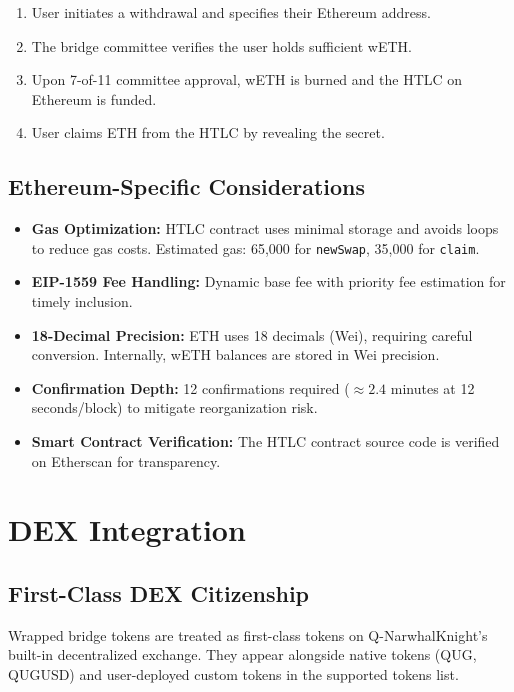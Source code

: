 \documentclass[11pt,a4paper]{article}
\begin{document}
\begin{enumerate}
    \item User initiates a withdrawal and specifies their Ethereum address.
    \item The bridge committee verifies the user holds sufficient wETH.
    \item Upon 7-of-11 committee approval, wETH is burned and the HTLC on Ethereum is funded.
    \item User claims ETH from the HTLC by revealing the secret.
\end{enumerate}

\subsection{Ethereum-Specific Considerations}

\begin{itemize}
    \item \textbf{Gas Optimization:} HTLC contract uses minimal storage and avoids loops to reduce gas costs. Estimated gas: 65,000 for \texttt{newSwap}, 35,000 for \texttt{claim}.
    \item \textbf{EIP-1559 Fee Handling:} Dynamic base fee with priority fee estimation for timely inclusion.
    \item \textbf{18-Decimal Precision:} ETH uses 18 decimals (Wei), requiring careful conversion. Internally, wETH balances are stored in Wei precision.
    \item \textbf{Confirmation Depth:} 12 confirmations required ($\approx 2.4$ minutes at 12 seconds/block) to mitigate reorganization risk.
    \item \textbf{Smart Contract Verification:} The HTLC contract source code is verified on Etherscan for transparency.
\end{itemize}

\section{DEX Integration}
\label{sec:dex}

\subsection{First-Class DEX Citizenship}

Wrapped bridge tokens are treated as first-class tokens on Q-NarwhalKnight's built-in decentralized exchange. They appear alongside native tokens (QUG, QUGUSD) and user-deployed custom tokens in the supported tokens list.
\end{document}
